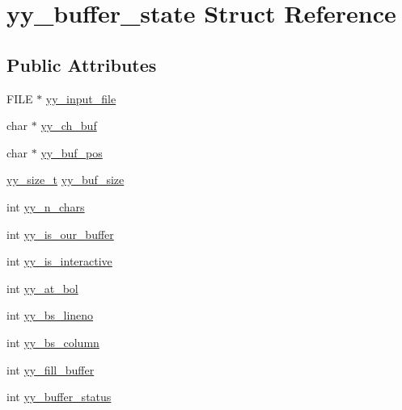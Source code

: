 \hypertarget{structyy__buffer__state}{\section{yy\-\_\-buffer\-\_\-state Struct Reference}
\label{structyy__buffer__state}
}
\subsection*{Public Attributes}
\begin{DoxyCompactItemize}
\item 
F\-I\-L\-E $\ast$ \hyperlink{structyy__buffer__state_a4843d1422e3276b636d475a3095bd948}{yy\-\_\-input\-\_\-file}
\item 
char $\ast$ \hyperlink{structyy__buffer__state_ad7b8df8d8a4688e57b0b8d3ca75adc85}{yy\-\_\-ch\-\_\-buf}
\item 
char $\ast$ \hyperlink{structyy__buffer__state_a58aa927f098b99d99e75da80f9b681ef}{yy\-\_\-buf\-\_\-pos}
\item 
\hyperlink{zconf_8lex_8c_ad557845057f187eec4be07e2717d2afa}{yy\-\_\-size\-\_\-t} \hyperlink{structyy__buffer__state_a48302f5f3477a9c78bbddf56d356ef54}{yy\-\_\-buf\-\_\-size}
\item 
int \hyperlink{structyy__buffer__state_a06406208824817acfec2183b79080945}{yy\-\_\-n\-\_\-chars}
\item 
int \hyperlink{structyy__buffer__state_a80ce2431c70dc4f89ced487f18449465}{yy\-\_\-is\-\_\-our\-\_\-buffer}
\item 
int \hyperlink{structyy__buffer__state_abf5c70eea75581b58c0ee7bd31b14490}{yy\-\_\-is\-\_\-interactive}
\item 
int \hyperlink{structyy__buffer__state_a9d60c60af6e1a6f69de16871fd64f85f}{yy\-\_\-at\-\_\-bol}
\item 
int \hyperlink{structyy__buffer__state_a818e94bc9c766e683c60df1e9fd01199}{yy\-\_\-bs\-\_\-lineno}
\item 
int \hyperlink{structyy__buffer__state_a10c4fcd8be759e6bf11e6d3e8cdb0307}{yy\-\_\-bs\-\_\-column}
\item 
int \hyperlink{structyy__buffer__state_a63d2afbb1d79a3fc63df9e12626f827d}{yy\-\_\-fill\-\_\-buffer}
\item 
int \hyperlink{structyy__buffer__state_a70fd925d37a2f0454fbd0def675d106c}{yy\-\_\-buffer\-\_\-status}
\end{DoxyCompactItemize}


